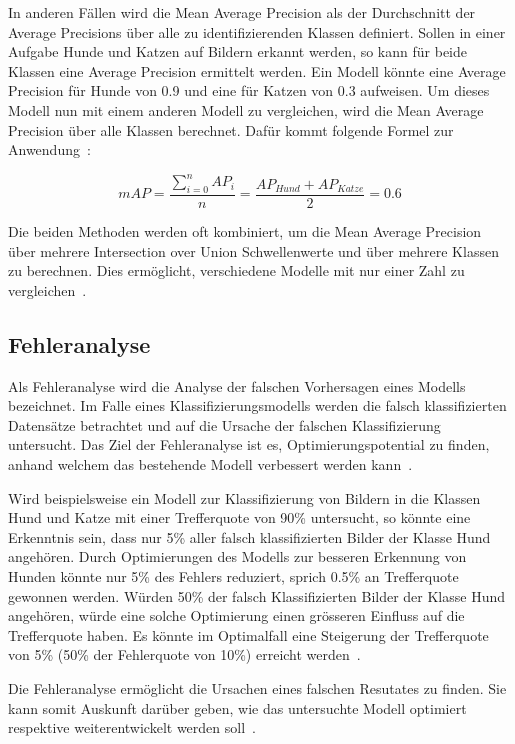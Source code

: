 In anderen Fällen wird die Mean Average Precision als der Durchschnitt der Average Precisions über alle zu identifizierenden Klassen definiert. Sollen in einer Aufgabe Hunde und Katzen auf Bildern erkannt werden, so kann für beide Klassen eine Average Precision ermittelt werden. Ein Modell könnte eine Average Precision für Hunde von 0.9 und eine für Katzen von 0.3 aufweisen. Um dieses Modell nun mit einem anderen Modell zu vergleichen, wird die Mean Average Precision über alle Klassen berechnet. Dafür kommt folgende Formel zur Anwendung~\autocite{AP}:

\nopagebreak
$$mAP = \frac{\sum_{i=0}^{n}AP_{i}}{n} = \frac{AP_{Hund}+AP_{Katze}}{2} = 0.6$$
\vspace*{0.2cm}

Die beiden Methoden werden oft kombiniert, um die Mean Average Precision über mehrere Intersection over Union Schwellenwerte und über mehrere Klassen zu berechnen. Dies ermöglicht, verschiedene Modelle mit nur einer Zahl zu vergleichen~\autocite{AP}.

\subsection{Fehleranalyse}
\label{chap:error-analysis}

Als Fehleranalyse wird die Analyse der falschen Vorhersagen eines Modells bezeichnet. Im Falle eines Klassifizierungsmodells werden die falsch klassifizierten Datensätze betrachtet und auf die Ursache der falschen Klassifizierung untersucht. Das Ziel der Fehleranalyse ist es, Optimierungspotential zu finden, anhand welchem das bestehende Modell verbessert werden kann~\autocite{MLYearning}.

Wird beispielsweise ein Modell zur Klassifizierung von Bildern in die Klassen Hund und Katze mit einer Trefferquote von 90\% untersucht, so könnte eine Erkenntnis sein, dass nur 5\% aller falsch klassifizierten Bilder der Klasse Hund angehören. Durch Optimierungen des Modells zur besseren Erkennung von Hunden könnte nur 5\% des Fehlers reduziert, sprich 0.5\% an Trefferquote gewonnen werden. Würden 50\% der falsch Klassifizierten Bilder der Klasse Hund angehören, würde eine solche Optimierung einen grösseren Einfluss auf die Trefferquote haben. Es könnte im Optimalfall eine Steigerung der Trefferquote von 5\% (50\% der Fehlerquote von 10\%) erreicht werden~\autocite{MLYearning}.

Die Fehleranalyse ermöglicht die Ursachen eines falschen Resutates zu finden. Sie kann somit Auskunft darüber geben, wie das untersuchte Modell optimiert respektive weiterentwickelt werden soll~\autocite{MLYearning}.


